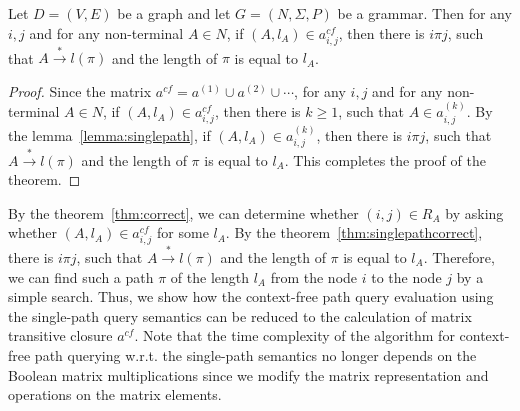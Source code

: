 \begin{mytheorem}\label{thm:singlepathcorrect}
	Let $D = (V,E)$ be a graph and let $G =(N,\Sigma,P)$ be a grammar. Then for any $i, j$ and for any non-terminal $A \in N$, if $(A, l_A) \in a^{cf}_{i,j}$, then there is $i \pi j$, such that $A \xrightarrow{*} l(\pi)$ and the length of $\pi$ is equal to $l_A$.
\end{mytheorem}
\begin{proof}
	
	Since the matrix $a^{cf} = a^{(1)} \cup a^{(2)} \cup \cdots$, for any $i, j$ and for any non-terminal $A \in N$, if $(A, l_A) \in a^{cf}_{i,j}$, then there is $k \geq 1$, such that $A \in a^{(k)}_{i,j}$. By the lemma~\ref{lemma:singlepath}, if $(A, l_A) \in a^{(k)}_{i,j}$, then there is $i \pi j$, such that $A \xrightarrow{*} l(\pi)$ and the length of $\pi$ is equal to $l_A$. This completes the proof of the theorem.
\end{proof}

By the theorem~\ref{thm:correct}, we can determine whether $(i,j) \in R_A$ by asking whether $(A, l_A) \in a^{cf}_{i,j}$ for some $l_A$. By the theorem~\ref{thm:singlepathcorrect}, there is $i \pi j$, such that $A \xrightarrow{*} l(\pi)$ and the length of $\pi$ is equal to $l_A$. Therefore, we can find such a path $\pi$ of the length $l_A$ from the node $i$ to the node $j$ by a simple search. Thus, we show how the context-free path query evaluation using the single-path query semantics can be reduced to the calculation of matrix transitive closure $a^{cf}$. Note that the time complexity of the algorithm for context-free path querying w.r.t. the single-path semantics no longer depends on the Boolean matrix multiplications since we modify the matrix representation and operations on the matrix elements.
